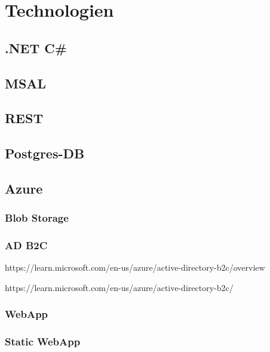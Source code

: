 \section{Technologien}


\subsection{.NET C\#}

\subsection{MSAL}

\subsection{REST}

\subsection{Postgres-DB}
\label{subsection:postgres_db}

\subsection{Azure}

\subsubsection{Blob Storage}
\label{subsection:azure_blob_storage}

\subsubsection{AD B2C}
\label{subsection:azure_ad_b2c}

https://learn.microsoft.com/en-us/azure/active-directory-b2c/overview

https://learn.microsoft.com/en-us/azure/active-directory-b2c/

\subsubsection{WebApp}
\label{subsection:azure_web_app}

\subsubsection{Static WebApp}
\label{subsection:azure_static_web_app}

